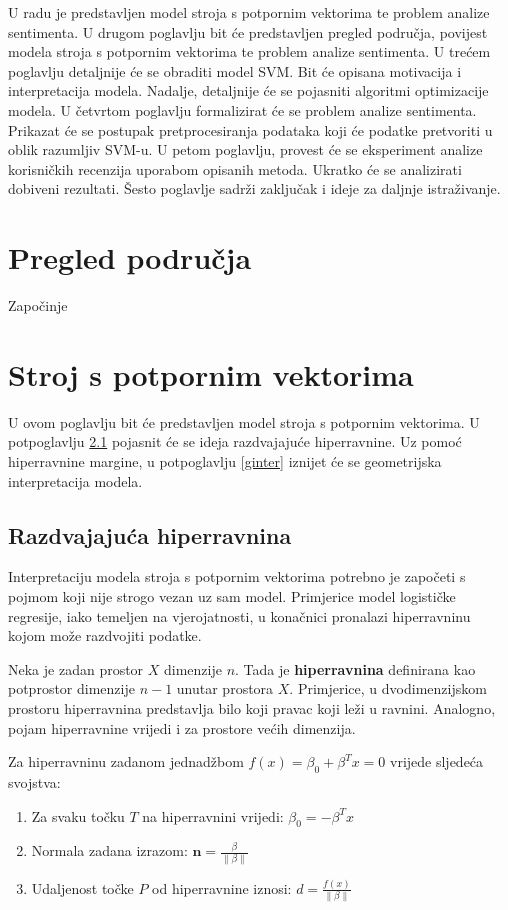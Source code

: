 \documentclass[times, utf8, zavrsni, numeric]{fer}
\begin{document}
\par U radu je predstavljen model stroja s potpornim vektorima te problem analize sentimenta.
U drugom poglavlju bit će predstavljen pregled područja, povijest modela stroja s potpornim vektorima te problem analize sentimenta.
U trećem poglavlju detaljnije će se obraditi model SVM.
Bit će opisana motivacija i interpretacija modela.
Nadalje, detaljnije će se pojasniti algoritmi optimizacije modela.
U četvrtom poglavlju formalizirat će se problem analize sentimenta.
Prikazat će se postupak pretprocesiranja podataka koji će podatke pretvoriti u oblik razumljiv SVM-u.
U petom poglavlju, provest će se eksperiment analize korisničkih recenzija uporabom opisanih metoda.
Ukratko će se analizirati dobiveni rezultati.
Šesto poglavlje sadrži zaključak i ideje za daljnje istraživanje. 

\chapter{Pregled područja} \label{ppodrucja}
Započinje \cite{vapnik1963}

\chapter{Stroj s potpornim vektorima} \label{svm}
U ovom poglavlju bit će predstavljen model stroja s potpornim vektorima. 
U potpoglavlju \ref{hmargine} pojasnit će se ideja razdvajajuće hiperravnine.
Uz pomoć hiperravnine margine, u potpoglavlju \ref{ginter} iznijet će se geometrijska interpretacija modela.

\section{Razdvajajuća hiperravnina} \label{hmargine}
Interpretaciju modela stroja s potpornim vektorima potrebno je započeti s pojmom koji nije strogo vezan uz sam model.
Primjerice model logističke regresije, iako temeljen na vjerojatnosti, u konačnici pronalazi hiperravninu kojom može razdvojiti
podatke.

\par Neka je zadan prostor $\textit{X}$ dimenzije $n$.
Tada je \textbf{hiperravnina} definirana kao potprostor dimenzije $n-1$ unutar prostora $\textit{X}$.
Primjerice, u dvodimenzijskom prostoru hiperravnina predstavlja bilo koji pravac koji leži u ravnini. 
Analogno, pojam hiperravnine vrijedi i za prostore većih dimenzija. 

\par Za hiperravninu zadanom jednadžbom $f(x)=\beta_0 + \beta^Tx = 0$ vrijede sljedeća svojstva:
\begin{enumerate}
  \item Za svaku točku $T$ na hiperravnini vrijedi: $\beta_0 = -\beta^Tx$
  \item Normala zadana izrazom: $\mathbf{n} = \frac{\beta}{\|\beta\|}$
  \item Udaljenost točke $P$ od hiperravnine iznosi: $d = \frac{f(x)}{\|\beta\|}$
\end{enumerate}
\end{document}
